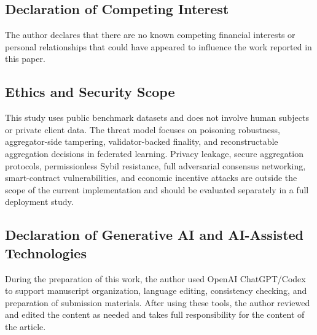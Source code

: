 \documentclass[preprint,authoryear,12pt]{elsarticle}
\begin{document}
\subsection{Declaration of Competing Interest}

The author declares that there are no known competing financial interests or personal relationships that could have appeared to influence the work reported in this paper.

\subsection{Ethics and Security Scope}

This study uses public benchmark datasets and does not involve human subjects or private client data. The threat model focuses on poisoning robustness, aggregator-side tampering, validator-backed finality, and reconstructable aggregation decisions in federated learning. Privacy leakage, secure aggregation protocols, permissionless Sybil resistance, full adversarial consensus networking, smart-contract vulnerabilities, and economic incentive attacks are outside the scope of the current implementation and should be evaluated separately in a full deployment study.

\subsection{Declaration of Generative AI and AI-Assisted Technologies}

During the preparation of this work, the author used OpenAI ChatGPT/Codex to support manuscript organization, language editing, consistency checking, and preparation of submission materials. After using these tools, the author reviewed and edited the content as needed and takes full responsibility for the content of the article.



\end{document}
